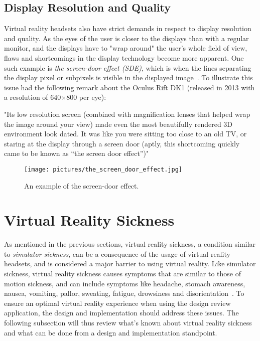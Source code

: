 \subsection{Display Resolution and Quality}
Virtual reality headsets also have strict demands in respect to display resolution and quality. As the eyes of the user is closer
to the displays than with a regular monitor, and the displays have to "wrap around" the user's whole field of view, flaws and shortcomings in the display technology 
become more apparent. 
One such example is \textit{the screen-door effect (SDE)}, 
which is when the lines separating the display pixel or subpixels is visible in the displayed image~\citep{TC2016}. 
To illustrate this issue \citet{TC2016} had the following remark about the Oculus Rift DK1 (released in 2013 with a resolution of 640×800 per eye):

"Its low resolution screen (combined with magnification lenses that helped wrap the image around your view) made even the most beautifully rendered 3D environment look dated. 
It was like you were sitting too close to an old TV, or staring at the display through a screen door (aptly, this shortcoming quickly came to be known as “the screen door effect”)"

\begin{figure}%
	\texttt{[image: pictures/the\_screen\_door\_effect.jpg]}
	\caption[The screen-door effect]{An example of the screen-door effect.}
	\label{fig:the_screen_door_effect}
\end{figure} 

\section{Virtual Reality Sickness}

As mentioned in the previous sections, virtual reality sickness, a condition similar to \textit{simulator sickness}, 
can be a consequence of the usage of virtual reality headsets, and is considered a major barrier to 
using virtual reality. Like simulator sickness, virtual reality sickness causes symptoms that are similar to those of motion sickness, and can include symptoms like 
headache, stomach awareness, nausea, vomiting, pallor, sweating, fatigue, drowsiness and disorientation~\citep{Kolasinski1995}. 
To ensure an optimal virtual reality experience when using the design review application, the design and implementation should address these issues.
The following subsection will thus review what's known about virtual reality sickness and what can be done from a design and 
implementation standpoint.


